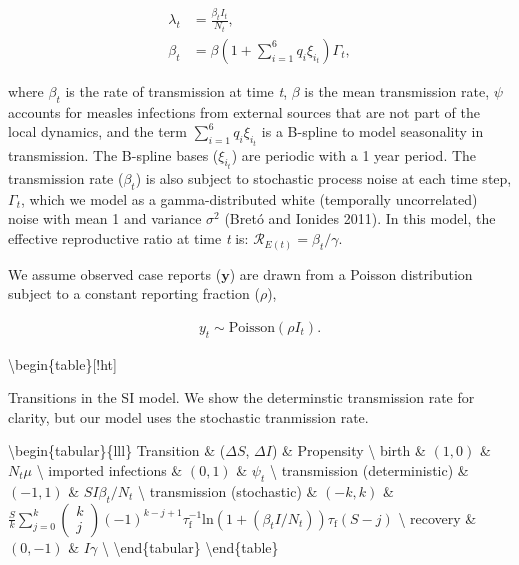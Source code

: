 \documentclass[11pt,]{article}
\begin{document}
\begin{align}
\lambda_t &= \frac{\beta_t I_t}{N_t}, \\
\beta_t &= \beta \left(1 + \sum^6_{i=1} q_i \xi_{i_{t}} \right) \Gamma_t,
\end{align}

\noindent{}where \(\beta_t\) is the rate of transmission at time
\emph{t}, \(\beta\) is the mean transmission rate, \(\psi\) accounts for
measles infections from external sources that are not part of the local
dynamics, and the term \(\sum^6_{i=1} q_i \xi_{i_{t}}\) is a B-spline to
model seasonality in transmission. The B-spline bases (\(\xi_{i_{t}}\))
are periodic with a 1 year period. The transmission rate (\(\beta_t\))
is also subject to stochastic process noise at each time step,
\(\Gamma_t\), which we model as a gamma-distributed white (temporally
uncorrelated) noise with mean 1 and variance \(\sigma^2\) (Bretó and
Ionides 2011). In this model, the effective reproductive ratio at time
\emph{t} is: \(\mathcal{R}_{E(t)} = \beta_t / \gamma\).

We assume observed case reports (\(\textbf{y}\)) are drawn from a
Poisson distribution subject to a constant reporting fraction
(\(\rho\)),

\begin{align}
y_t \sim \text{Poisson} \left( \rho I_t \right).
\end{align}

\textbackslash{}begin\{table\}{[}!ht{]} \centering

\caption{Transitions in the SI model. We show the determinstic transmission rate for clarity, but our model uses the stochastic tranmission rate.}

\textbackslash{}begin\{tabular\}\{lll\} \toprule Transition \&
(\(\Delta S\), \(\Delta I\)) \& Propensity \textbackslash{} \midrule
birth \& \((1, 0)\) \& \(N_t \mu\) \textbackslash{} imported infections
\& \((0, 1)\) \& \(\psi_t\) \textbackslash{} transmission
(deterministic) \& \((-1, 1)\) \& \(SI \beta_t / N_t\) \textbackslash{}
transmission (stochastic) \& \((-k, k)\) \&
\(\frac{S}{k}\sum^k_{j=0} \left(\begin{matrix}k\\j\end{matrix} \right) (-1)^{k-j+1} \tau_{\text{f}}^{-1} \text{ln}(1 + (\beta_tI/N_t)) \tau_{\text{f}} (S-j)\)
\textbackslash{} recovery \& \((0, -1)\) \& \(I\gamma\) \textbackslash{}
\bottomrule \textbackslash{}end\{tabular\} \label{table:model-trans}
\textbackslash{}end\{table\}

\nolinenumbers
\end{document}
